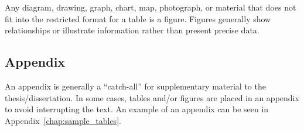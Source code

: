 Any diagram, drawing, graph, chart, map, photograph, or material that
does not fit into the restricted format for a table is a figure.
Figures generally show relationships or illustrate information rather
than present precise data.


\subsection{Appendix}
\label{sec:DefAppendix}

An appendix is generally a ``catch-all'' for supplementary material to
the the\-sis/dis\-ser\-ta\-tion. In some cases, tables and/or figures
are placed in an appendix to avoid interrupting the text. An example of an appendix can be seen in Appendix~\ref{chap:sample_tables}.

